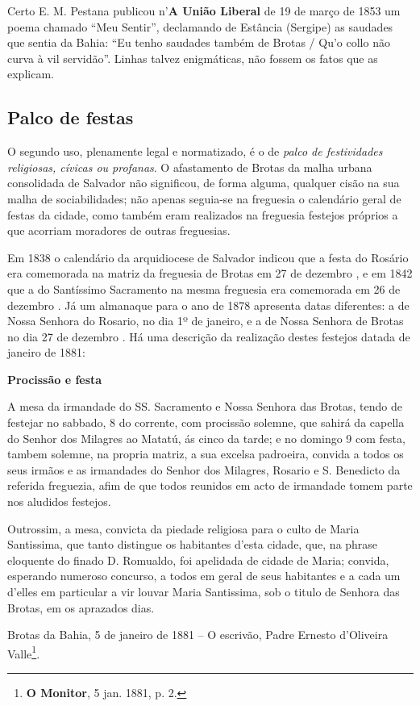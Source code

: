 Certo E. M. Pestana publicou n'\textbf{A União Liberal} de 19 de março de 1853 um poema chamado ``Meu Sentir'', declamando de Estância (Sergipe) as saudades que sentia da Bahia: ``Eu tenho saudades também de Brotas / Qu'o collo não curva à vil servidão''. Linhas talvez enigmáticas, não fossem os fatos que as explicam.

\subsection{Palco de festas}

O segundo uso, plenamente legal e normatizado, é o de \textit{palco de festividades religiosas, cívicas ou profanas}. O afastamento de Brotas da malha urbana consolidada de Salvador não significou, de forma alguma, qualquer cisão na sua malha de sociabilidades; não apenas seguia-se na freguesia o calendário geral de festas da cidade, como também eram realizados na freguesia festejos próprios a que acorriam moradores de outras freguesias.

Em 1838 o calendário da arquidiocese de Salvador indicou que a festa do Rosário era comemorada na matriz da freguesia de Brotas em 27 de dezembro \cite[p.~44]{arcebis_diario_1837}, e em 1842 que a do Santíssimo Sacramento na mesma freguesia era comemorada em 26 de dezembro \cite[p.~55]{arcebis_folhinha_1841}. Já um almanaque para o ano de 1878 apresenta datas diferentes: a de Nossa Senhora do Rosario, no dia 1º de janeiro, e a de Nossa Senhora de Brotas no dia 27 de dezembro \cite[pp.~53,~109]{macosta_almana_1877}. Há uma descrição da realização destes festejos datada de janeiro de 1881:

\begin{citacao}
\textbf{Procissão e festa}

A mesa da irmandade do SS. Sacramento e Nossa Senhora das Brotas, tendo de festejar no sabbado, 8 do corrente, com procissão solemne, que sahirá da capella do Senhor dos Milagres ao Matatú, ás cinco da tarde; e no domingo 9 com festa, tambem solemne, na propria matriz, a sua excelsa padroeira, convida a todos os seus irmãos e as irmandades do Senhor dos Milagres, Rosario e S. Benedicto da referida freguezia, afim de que todos reunidos em acto de irmandade tomem parte nos aludidos festejos.

Outrossim, a mesa, convicta da piedade religiosa para o culto de Maria Santissima, que tanto distingue os habitantes d'esta cidade, que, na phrase eloquente do finado D. Romualdo, foi apelidada de cidade de Maria; convida, esperando numeroso concurso, a todos em geral de seus habitantes e a cada um d'elles em particular a vir louvar Maria Santissima, sob o titulo de Senhora das Brotas, em os aprazados dias.

Brotas da Bahia, 5 de janeiro de 1881 -- O escrivão, Padre Ernesto d'Oliveira Valle\footnote{\textbf{O Monitor}, 5 jan. 1881, p. 2.}.
\end{citacao}

